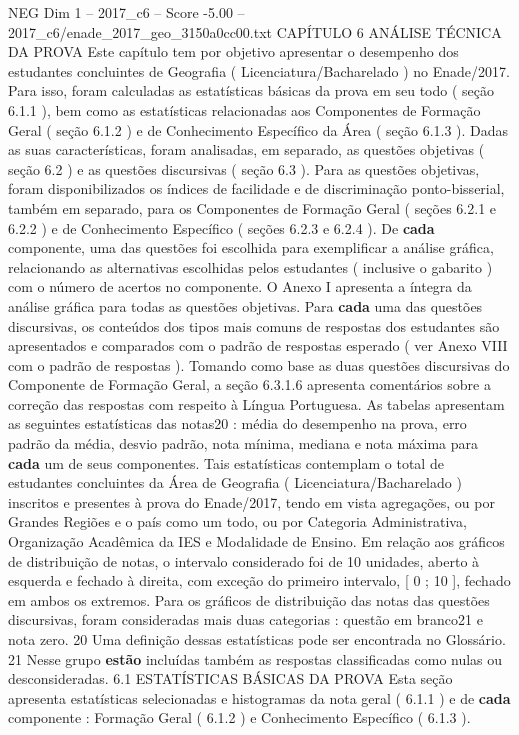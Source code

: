 \begin{textsample}{NEG Dim 1 – 2017\_c6 – Score -5.00 – 2017\_c6/enade\_2017\_geo\_3150a0cc00.txt}  \label{ex:f1_neg_146}
CAPÍTULO 6 ANÁLISE TÉCNICA DA PROVA Este capítulo tem por objetivo apresentar o desempenho dos estudantes concluintes de Geografia ( Licenciatura/Bacharelado ) no Enade/2017.
Para isso, foram calculadas as estatísticas básicas da prova em seu todo ( seção 6.1.1 ), bem como as estatísticas relacionadas aos Componentes de Formação Geral ( seção 6.1.2 ) e de Conhecimento Específico da Área ( seção 6.1.3 ).
Dadas as suas características, foram analisadas, em separado, as questões objetivas ( seção 6.2 ) e as questões discursivas ( seção 6.3 ).
Para as questões objetivas, foram disponibilizados os índices de facilidade e de discriminação ponto-bisserial, também em separado, para os Componentes de Formação Geral ( seções 6.2.1 e 6.2.2 ) e de Conhecimento Específico ( seções 6.2.3 e 6.2.4 ).
De \textbf{cada} componente, uma das questões foi escolhida para exemplificar a análise gráfica, relacionando as alternativas escolhidas pelos estudantes ( inclusive o gabarito ) com o número de acertos no componente.
O Anexo I apresenta a íntegra da análise gráfica para todas as questões objetivas.
Para \textbf{cada} uma das questões discursivas, os conteúdos dos tipos mais comuns de respostas dos estudantes são apresentados e comparados com o padrão de respostas esperado ( ver Anexo VIII com o padrão de respostas ).
Tomando como base as duas questões discursivas do Componente de Formação Geral, a seção 6.3.1.6 apresenta comentários sobre a correção das respostas com respeito à Língua Portuguesa.
As tabelas apresentam as seguintes estatísticas das notas20 : média do desempenho na prova, erro padrão da média, desvio padrão, nota mínima, mediana e nota máxima para \textbf{cada} um de seus componentes.
Tais estatísticas contemplam o total de estudantes concluintes da Área de Geografia ( Licenciatura/Bacharelado ) inscritos e presentes à prova do Enade/2017, tendo em vista agregações, ou por Grandes Regiões e o país como um todo, ou por Categoria Administrativa, Organização Acadêmica da IES e Modalidade de Ensino.
Em relação aos gráficos de distribuição de notas, o intervalo considerado foi de 10 unidades, aberto à esquerda e fechado à direita, com exceção do primeiro intervalo, [ 0 ; 10 ], fechado em ambos os extremos.
Para os gráficos de distribuição das notas das questões discursivas, foram consideradas mais duas categorias : questão em branco21 e nota zero. 20 Uma definição dessas estatísticas pode ser encontrada no Glossário. 21 Nesse grupo \textbf{estão} incluídas também as respostas classificadas como nulas ou desconsideradas. 6.1 ESTATÍSTICAS BÁSICAS DA PROVA Esta seção apresenta estatísticas selecionadas e histogramas da nota geral ( 6.1.1 ) e de \textbf{cada} componente : Formação Geral ( 6.1.2 ) e Conhecimento Específico ( 6.1.3 ).

\end{textsample}
